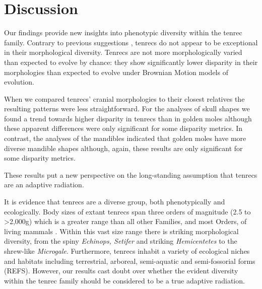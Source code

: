 \documentclass[12pt,a4paper]{article}
\begin{document}
\section{Discussion} %


Our findings provide new insights into phenotypic diversity within the tenrec family.  
Contrary to previous suggestions \citep[e.g.][]{Eisenberg1969, Olson2013}, tenrecs do not appear to be exceptional in their morphological diversity. 
Tenrecs are not more morphologically varied than expected to evolve by chance: they show significantly lower disparity in their morphologies than expected to evolve under Brownian Motion models of evolution. 

When we compared tenrecs' cranial morphologies to their closest relatives the resulting patterns were less straightforward. For the analyses of skull shapes we found a trend towards higher disparity in tenrecs than in golden moles although these apparent differences were only significant for some disparity metrics. In contrast, the analyses of the mandibles indicated that golden moles have more diverse mandible shapes although, again, these results are only significant for some disparity metrics. %

These results put a new perspective on the long-standing assumption that tenrecs are an adaptive radiation.


It is evidence that tenrecs are a diverse group, both phenotypically and ecologically. Body sizes of extant tenrecs span three orders of magnitude (2.5 to \textgreater 2,000g) which is a greater range than all other Families, and most Orders, of living mammals \citep{Olson2003}. Within this vast size range there is striking morphological diversity, from the spiny \textit{Echinops, Setifer} and striking \textit{Hemicentetes} to the shrew-like  \textit{Microgale}. Furthermore, tenrecs inhabit a variety of ecological niches and habitats including terrestrial, arboreal, semi-aquatic and semi-fossorial forms (REFS). However, our results cast doubt over whether the evident diversity within the tenrec family should be considered to be a true adaptive radiation. 
\end{document}
